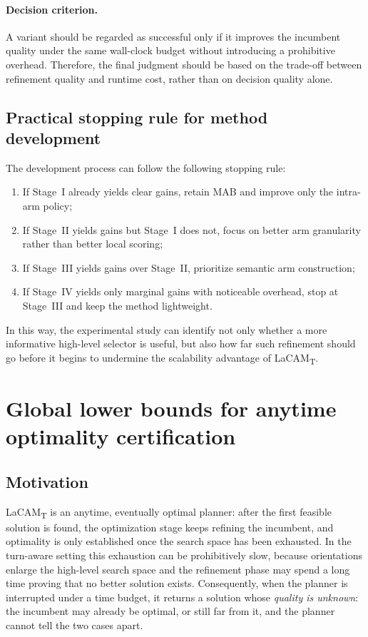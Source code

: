 \documentclass[lettersize,journal]{IEEEtran}
\begin{document}
\paragraph{Decision criterion.}
A variant should be regarded as successful only if it improves the incumbent quality under the same wall-clock budget without introducing a prohibitive overhead. Therefore, the final judgment should be based on the trade-off between refinement quality and runtime cost, rather than on decision quality alone.

\subsection{Practical stopping rule for method development}

The development process can follow the following stopping rule:
\begin{enumerate}[(1)]
    \item If Stage~I already yields clear gains, retain MAB and improve only the intra-arm policy;
    \item If Stage~II yields gains but Stage~I does not, focus on better arm granularity rather than better local scoring;
    \item If Stage~III yields gains over Stage~II, prioritize semantic arm construction;
    \item If Stage~IV yields only marginal gains with noticeable overhead, stop at Stage~III and keep the method lightweight.
\end{enumerate}

In this way, the experimental study can identify not only whether a more informative high-level selector is useful, but also how far such refinement should go before it begins to undermine the scalability advantage of LaCAM\textsubscript{T}.

\section{Global lower bounds for anytime optimality certification}
\label{sec:lower_bounds}

\subsection{Motivation}
\label{subsec:lb_motivation}

LaCAM\textsubscript{T} is an anytime, eventually optimal planner: after the first feasible solution is found, the optimization stage keeps refining the incumbent, and optimality is only established once the search space has been exhausted. In the turn-aware setting this exhaustion can be prohibitively slow, because orientations enlarge the high-level search space and the refinement phase may spend a long time proving that no better solution exists. Consequently, when the planner is interrupted under a time budget, it returns a solution whose \emph{quality is unknown}: the incumbent may already be optimal, or still far from it, and the planner cannot tell the two cases apart.
\end{document}
